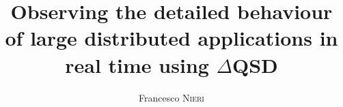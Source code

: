\documentclass{EPL-master-thesis-covers-EN}
\title{Observing the detailed behaviour of large distributed applications in real time using $\Delta$QSD}
\author{Francesco \textsc{Nieri}}
\begin{document}
  \maketitle
    \tableofcontents
    
    
  \backcoverpage
\end{document}
